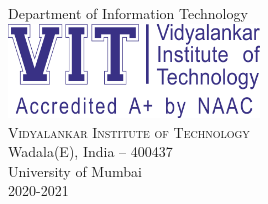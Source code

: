 \begin{titlepage}
\begin{center}
              \Large{Department of Information Technology}\\
              \vspace{.2in}
              \includegraphics[width=0.50\textwidth]{./vit-logo.png}\\[0.1in]
              \normalsize
              \textsc{Vidyalankar Institute of Technology}\\
              Wadala(E), India -- 400437\\
              \vspace{.4in}
              \large{University of Mumbai\\
                     2020-2021}

       \end{center}

\end{titlepage}
